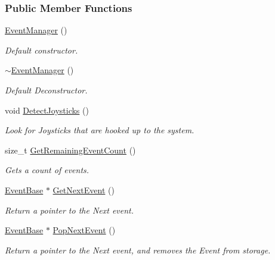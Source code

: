 \subsubsection*{Public Member Functions}
\begin{DoxyCompactItemize}
\item 
\hyperlink{classphys_1_1EventManager_a018b36588bf2a2e90536e64be060d6fc}{EventManager} ()
\begin{DoxyCompactList}\small\item\em Default constructor. \item\end{DoxyCompactList}\item 
\hyperlink{classphys_1_1EventManager_aa6df8df9b7a11dadcd9bc79ecdf54558}{$\sim$EventManager} ()
\begin{DoxyCompactList}\small\item\em Default Deconstructor. \item\end{DoxyCompactList}\item 
void \hyperlink{classphys_1_1EventManager_a0b36c605c2a059c96e787ed4c1fd68bc}{DetectJoysticks} ()
\begin{DoxyCompactList}\small\item\em Look for Joysticks that are hooked up to the system. \item\end{DoxyCompactList}\item 
size\_\-t \hyperlink{classphys_1_1EventManager_af3e02562344e4de9c40d91446acd84dc}{GetRemainingEventCount} ()
\begin{DoxyCompactList}\small\item\em Gets a count of events. \item\end{DoxyCompactList}\item 
\hyperlink{classphys_1_1EventBase}{EventBase} $\ast$ \hyperlink{classphys_1_1EventManager_aa0937763961aefc59aea197a8f9bc0dc}{GetNextEvent} ()
\begin{DoxyCompactList}\small\item\em Return a pointer to the Next event. \item\end{DoxyCompactList}\item 
\hyperlink{classphys_1_1EventBase}{EventBase} $\ast$ \hyperlink{classphys_1_1EventManager_ae403b203bc425744377ec5fc311f4e5d}{PopNextEvent} ()
\begin{DoxyCompactList}\small\item\em Return a pointer to the Next event, and removes the Event from storage. \item\end{DoxyCompactList}\item 

\end{DoxyCompactItemize}
